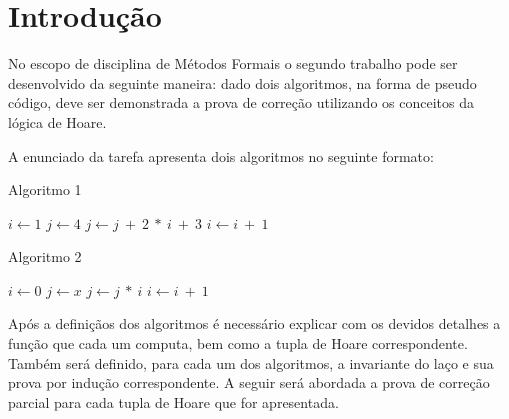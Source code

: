 \section{Introdução}
No escopo de disciplina de Métodos Formais o segundo trabalho pode ser
desenvolvido da seguinte maneira: dado dois algoritmos, na forma de pseudo
código, deve ser demonstrada a prova de correção utilizando os conceitos da
lógica de Hoare.

A enunciado da tarefa apresenta dois algoritmos no seguinte formato:

\begin{minipage}{6cm}
  \begin{algorithm}[H]
    \caption{Algoritmo 1}
    \begin{algorithmic}
      \State $i\gets 1$
      \State $j\gets 4$
      \State $j \gets j\ +\ 2\ *\ i\ +\ 3$
      \State $i\gets i\ +\ 1$
      \EndWhile
      \EndFunction
      \end{algorithmic}
  \end{algorithm}
\end{minipage}%
\begin{minipage}{7cm}
  \begin{algorithm}[H]
    \caption{Algoritmo 2}
    \begin{algorithmic}
      \State $i\gets 0$
      \State $j\gets x$
      \State $j \gets j\ *\ i$
      \State $i\gets i\ +\ 1$
      \EndWhile\label{euclidendwhile}
      \EndFunction
      \end{algorithmic}
  \end{algorithm}
\end{minipage}

\vspace{0.3cm}

Após a definiçãos dos algoritmos é necessário explicar com os devidos detalhes a
função que cada um computa, bem como a tupla de Hoare correspondente. Também
será definido, para cada um dos algoritmos, a invariante do laço e sua prova por
indução correspondente. A seguir será abordada a prova de correção parcial para
cada tupla de Hoare que for apresentada.
